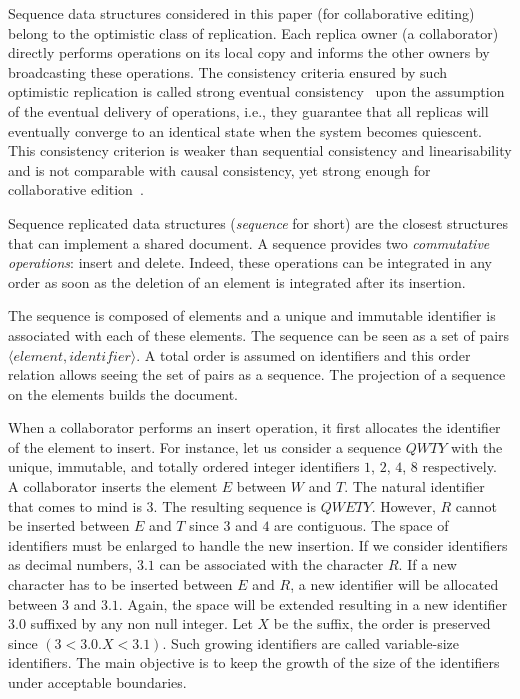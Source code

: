 Sequence data structures considered in this paper (for collaborative
editing) belong to the optimistic class of replication. Each replica owner (a
collaborator) directly performs operations on its local copy and informs the
other owners by broadcasting these operations. The consistency criteria ensured
by such optimistic replication is called strong eventual
consistency~\cite{shapiro2011comprehensive} upon the assumption of the eventual
delivery of operations, i.e., they guarantee that all replicas will eventually
converge to an identical state when the system becomes quiescent. This
consistency criterion is weaker than sequential consistency and linearisability
and is not comparable with causal consistency, yet strong enough for
collaborative edition~\cite{shapiro2011comprehensive}.

Sequence replicated data structures (\emph{sequence} for short) are the closest
structures that can implement a shared document. A sequence provides two
\emph{commutative operations}: insert and delete. Indeed, these operations can
be integrated in any order as soon as the deletion of an element is integrated
after its insertion.

The sequence is composed of elements and a unique and immutable identifier is
associated with each of these elements. The sequence can be seen as a set of
pairs $\langle element, identifier \rangle$. A total order is assumed on
identifiers and this order relation allows seeing the set of pairs as a
sequence. The projection of a sequence on the elements builds the document.

When a collaborator performs an insert operation, it first allocates the
identifier of the element to insert. For instance, let us consider a sequence
$QWTY$ with the unique, immutable, and totally ordered integer identifiers $1$,
$2$, $4$, $8$ respectively. A collaborator inserts the element $E$ between $W$
and $T$. The natural identifier that comes to mind is $3$. The resulting
sequence is $QWETY$. However, $R$ cannot be inserted between $E$ and $T$ since
$3$ and $4$ are contiguous. The space of identifiers must be enlarged to handle
the new insertion. If we consider identifiers as decimal numbers, $3.1$ can be
associated with the character $R$. If a new character has to be inserted
between $E$ and $R$, a new identifier will be allocated between $3$ and
$3.1$. Again, the space will be extended resulting in a new identifier $3.0$
suffixed by any non null integer. Let $X$ be the suffix, the order is preserved
since $(3 < 3.0.X < 3.1)$. Such growing identifiers are called variable-size
identifiers. The main objective is to keep the growth of the size of the
identifiers under acceptable boundaries.

